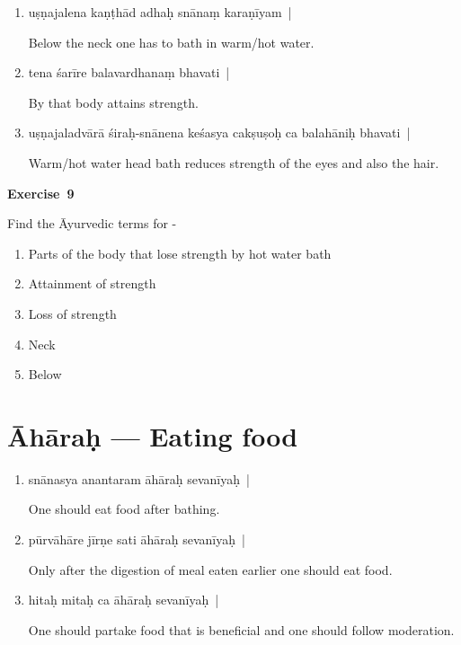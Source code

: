 \begin{enumerate}
\itemsep=0pt
\item {}

uṣṇajalena kaṇṭhād adhaḥ snānaṃ karaṇīyam~| 

Below the neck one has to bath in warm/hot water. 

\item {}

tena śarīre balavardhanaṃ bhavati~| 

By that body attains strength. 

\item {}

uṣṇajaladvārā śiraḥ-snānena keśasya cakṣuṣoḥ ca balahāniḥ bhavati~|  

Warm/hot water head bath reduces strength of the eyes and also the hair.
\end{enumerate}

\centerline{\textbf{Exercise~9}}

Find the Āyurvedic terms for -
\begin{enumerate}
\itemsep=0pt
\renewcommand{\theenumi}{\alph{enumi}}
\renewcommand{\labelenumi}{\theenumi.}
\item Parts of the body that lose strength by hot water bath 
\item Attainment of strength 
\item Loss of strength
\item Neck 
\item Below
\end{enumerate}

\chapter{Āhāraḥ --- Eating food}

\begin{enumerate}
\itemsep=0pt
\item {}

snānasya anantaram āhāraḥ sevanīyaḥ~|

One should eat food after bathing. 

\item {}

pūrvāhāre jīrṇe sati  āhāraḥ sevanīyaḥ~|

Only after the digestion of meal eaten earlier one should eat food. 

\item {}

hitaḥ mitaḥ ca āhāraḥ sevanīyaḥ~|

One should partake food that is beneficial and one should follow moderation.
\end{enumerate}

